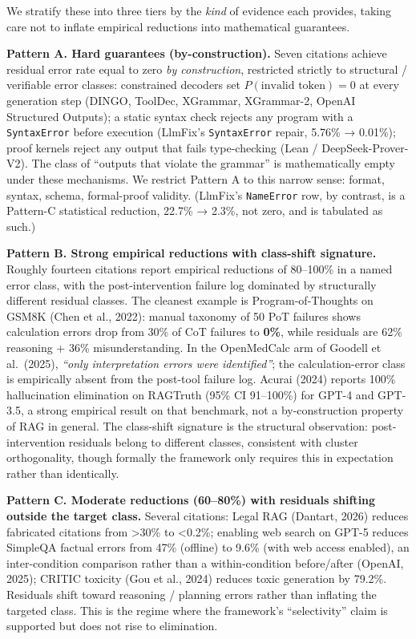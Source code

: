 \documentclass[
]{article}
\begin{document}
We stratify these into three tiers by the \emph{kind} of evidence each
provides, taking care not to inflate empirical reductions into
mathematical guarantees.

\textbf{Pattern A. Hard guarantees (by-construction).} Seven citations
achieve residual error rate equal to zero \emph{by construction},
restricted strictly to structural / verifiable error classes:
constrained decoders set \(P(\text{invalid token}) = 0\) at every
generation step (DINGO, ToolDec, XGrammar, XGrammar-2, OpenAI Structured
Outputs); a static syntax check rejects any program with a
\texttt{SyntaxError} before execution (LlmFix's \texttt{SyntaxError}
repair, 5.76\% → 0.01\%); proof kernels reject any output that fails
type-checking (Lean / DeepSeek-Prover-V2). The class of ``outputs that
violate the grammar'' is mathematically empty under these mechanisms. We
restrict Pattern A to this narrow sense: format, syntax, schema,
formal-proof validity. (LlmFix's \texttt{NameError} row, by contrast, is
a Pattern-C statistical reduction, 22.7\% → 2.3\%, not zero, and is
tabulated as such.)

\textbf{Pattern B. Strong empirical reductions with class-shift
signature.} Roughly fourteen citations report empirical reductions of
80--100\% in a named error class, with the post-intervention failure log
dominated by structurally different residual classes. The cleanest
example is Program-of-Thoughts on GSM8K (Chen et al., 2022): manual
taxonomy of 50 PoT failures shows calculation errors drop from 30\% of
CoT failures to \textbf{0\%}, while residuals are 62\% reasoning + 36\%
misunderstanding. In the OpenMedCalc arm of Goodell et al.~(2025),
\emph{``only interpretation errors were identified''}; the
calculation-error class is empirically absent from the post-tool failure
log. Acurai (2024) reports 100\% hallucination elimination on RAGTruth
(95\% CI 91--100\%) for GPT-4 and GPT-3.5, a strong empirical result on
that benchmark, not a by-construction property of RAG in general. The
class-shift signature is the structural observation: post-intervention
residuals belong to different classes, consistent with cluster
orthogonality, though formally the framework only requires this in
expectation rather than identically.

\textbf{Pattern C. Moderate reductions (60--80\%) with residuals
shifting outside the target class.} Several citations: Legal RAG
(Dantart, 2026) reduces fabricated citations from \textgreater30\% to
\textless0.2\%; enabling web search on GPT-5 reduces SimpleQA factual
errors from 47\% (offline) to 9.6\% (with web access enabled), an
inter-condition comparison rather than a within-condition before/after
(OpenAI, 2025); CRITIC toxicity (Gou et al., 2024) reduces toxic
generation by 79.2\%. Residuals shift toward reasoning / planning errors
rather than inflating the targeted class. This is the regime where the
framework's ``selectivity'' claim is supported but does not rise to
elimination.
\end{document}
